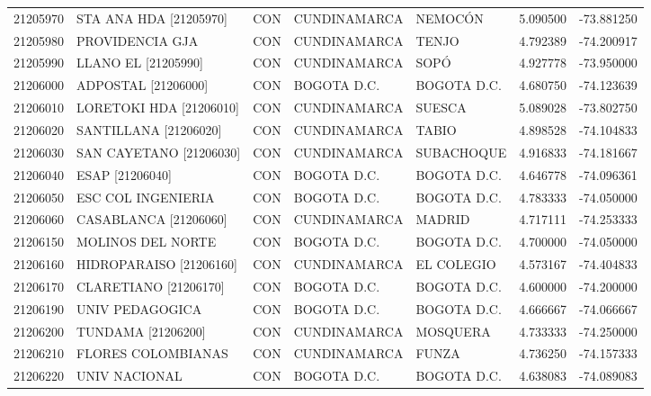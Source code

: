 \begin{longtable}{rllllrr}
 21205970 &      STA ANA HDA [21205970] &  CON &     CUNDINAMARCA &           NEMOCÓN &  5.090500 & -73.881250 \\
 21205980 &             PROVIDENCIA GJA &  CON &     CUNDINAMARCA &             TENJO &  4.792389 & -74.200917 \\
 21205990 &         LLANO EL [21205990] &  CON &     CUNDINAMARCA &              SOPÓ &  4.927778 & -73.950000 \\
 21206000 &         ADPOSTAL [21206000] &  CON &      BOGOTA D.C. &       BOGOTA D.C. &  4.680750 & -74.123639 \\
 21206010 &     LORETOKI HDA [21206010] &  CON &     CUNDINAMARCA &            SUESCA &  5.089028 & -73.802750 \\
 21206020 &    SANTILLANA    [21206020] &  CON &     CUNDINAMARCA &             TABIO &  4.898528 & -74.104833 \\
 21206030 &     SAN CAYETANO [21206030] &  CON &     CUNDINAMARCA &        SUBACHOQUE &  4.916833 & -74.181667 \\
 21206040 &             ESAP [21206040] &  CON &      BOGOTA D.C. &       BOGOTA D.C. &  4.646778 & -74.096361 \\
 21206050 &          ESC COL INGENIERIA &  CON &      BOGOTA D.C. &       BOGOTA D.C. &  4.783333 & -74.050000 \\
 21206060 &       CASABLANCA [21206060] &  CON &     CUNDINAMARCA &            MADRID &  4.717111 & -74.253333 \\
 21206150 &           MOLINOS DEL NORTE &  CON &      BOGOTA D.C. &       BOGOTA D.C. &  4.700000 & -74.050000 \\
 21206160 &     HIDROPARAISO [21206160] &  CON &     CUNDINAMARCA &        EL COLEGIO &  4.573167 & -74.404833 \\
 21206170 &       CLARETIANO [21206170] &  CON &      BOGOTA D.C. &       BOGOTA D.C. &  4.600000 & -74.200000 \\
 21206190 &             UNIV PEDAGOGICA &  CON &      BOGOTA D.C. &       BOGOTA D.C. &  4.666667 & -74.066667 \\
 21206200 &          TUNDAMA [21206200] &  CON &     CUNDINAMARCA &          MOSQUERA &  4.733333 & -74.250000 \\
 21206210 &          FLORES COLOMBIANAS &  CON &     CUNDINAMARCA &             FUNZA &  4.736250 & -74.157333 \\
 21206220 &               UNIV NACIONAL &  CON &      BOGOTA D.C. &       BOGOTA D.C. &  4.638083 & -74.089083 \\

\end{longtable}
